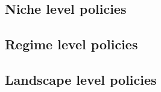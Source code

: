 
\subsection{Niche level policies}
\label{ss:results:policies_niche}

\subsection{Regime level policies}
\label{ss:results:policies_regime}

\subsection{Landscape level policies}
\label{ss:results:policies_landscape}